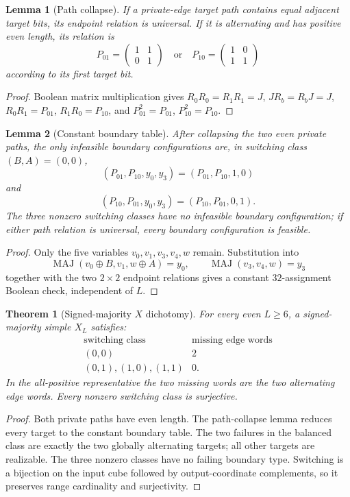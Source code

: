 \documentclass[11pt]{article}
\newtheorem{theorem}{Theorem}
\newtheorem{lemma}{Lemma}
\begin{document}
\begin{lemma}[Path collapse]
If a private-edge target path contains equal adjacent target bits, its endpoint
relation is universal. If it is alternating and has positive even length, its
relation is
\[
 P_{01}=\begin{pmatrix}1&1\\0&1\end{pmatrix}
 \quad\text{or}\quad
 P_{10}=\begin{pmatrix}1&0\\1&1\end{pmatrix}
\]
according to its first target bit.
\end{lemma}
\begin{proof}
Boolean matrix multiplication gives
$R_0R_0=R_1R_1=J$, $JR_b=R_bJ=J$,
$R_0R_1=P_{01}$, $R_1R_0=P_{10}$, and
$P_{01}^2=P_{01}$, $P_{10}^2=P_{10}$.
\end{proof}

\begin{lemma}[Constant boundary table]
After collapsing the two even private paths, the only infeasible boundary
configurations are, in switching class $(B,A)=(0,0)$,
\[
 (P_{01},P_{10},y_0,y_3)=(P_{01},P_{10},1,0)
\]
and
\[
 (P_{10},P_{01},y_0,y_3)=(P_{10},P_{01},0,1).
\]
The three nonzero switching classes have no infeasible boundary configuration;
if either path relation is universal, every boundary configuration is feasible.
\end{lemma}
\begin{proof}
Only the five variables $v_0,v_1,v_3,v_4,w$ remain. Substitution into
\[
 \operatorname{MAJ}(v_0\oplus B,v_1,w\oplus A)=y_0,\qquad
 \operatorname{MAJ}(v_3,v_4,w)=y_3
\]
together with the two $2\times2$ endpoint relations gives a constant
$32$-assignment Boolean check, independent of $L$.
\end{proof}

\begin{theorem}[Signed-majority $X$ dichotomy]
For every even $L\ge6$, a signed-majority simple $X_L$ satisfies:
\[
\begin{array}{c|c}
\text{switching class}&\text{missing edge words}\\\hline
(0,0)&2\\
(0,1),(1,0),(1,1)&0.
\end{array}
\]
In the all-positive representative the two missing words are the two alternating
edge words. Every nonzero switching class is surjective.
\end{theorem}
\begin{proof}
Both private paths have even length. The path-collapse lemma reduces every
target to the constant boundary table. The two failures in the balanced class
are exactly the two globally alternating targets; all other targets are
realizable. The three nonzero classes have no failing boundary type. Switching
is a bijection on the input cube followed by output-coordinate complements, so
it preserves range cardinality and surjectivity.
\end{proof}
\end{document}
